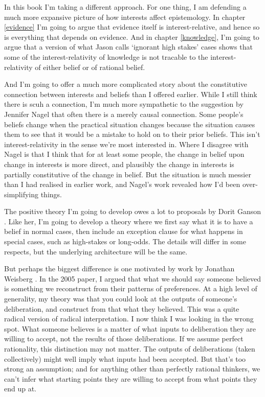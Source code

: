 \documentclass[11pt,]{book}
\begin{document}
In this book I'm taking a different approach. For one thing, I am defending a much more expansive picture of how interests affect epistemology. In chapter \ref{evidence} I'm going to argue that evidence itself is interest-relative, and hence so is everything that depends on evidence. And in chapter \ref{knowledge}, I'm going to argue that a version of what Jason \citet{Stanley2005} calls `ignorant high stakes' cases shows that some of the interest-relativity of knowledge is not tracable to the interest-relativity of either belief or of rational belief.

And I'm going to offer a much more complicated story about the constitutive connection between interests and beliefs than I offered earlier. While I still think there is scuh a connection, I'm much more sympathetic to the suggestion by Jennifer Nagel \citetext{\citeyear{Nagel2008}; \citeyear{Nagel2010}} that often there is a merely causal connection. Some people's beliefs change when the practical situation changes because the situation causes them to see that it would be a mistake to hold on to their prior beliefs. This isn't interest-relativity in the sense we're most interested in. Where I disagree with Nagel is that I think that for at least some people, the change in belief upon change in interests is more direct, and plausibly the change in interests is partially constitutive of the change in belief. But the situation is much messier than I had realised in earlier work, and Nagel's work revealed how I'd been over-simplifying things.

The positive theory I'm going to develop owes a lot to proposals by Dorit Ganson \citetext{\citeyear{Ganson2008}; \citeyear{Ganson2019}}. Like her, I'm going to develop a theory where we first say what it is to have a belief in normal cases, then include an exception clause for what happens in special cases, such as high-stakes or long-odds. The details will differ in some respects, but the underlying architecture will be the same.

But perhaps the biggest difference is one motivated by work by Jonathan Weisberg \citetext{\citeyear{Weisberg2013}; \citeyear{Weisberg2020}}. In the 2005 paper, I argued that what we should say someone believed is something we reconstruct from their patterns of preferences. At a high level of generality, my theory was that you could look at the outputs of someone's deliberation, and construct from that what they believed. This was a quite radical version of radical interpretation. I now think I was looking in the wrong spot. What someone believes is a matter of what inputs to deliberation they are willing to accept, not the results of those deliberations. If we assume perfect rationality, this distinction may not matter. The outputs of deliberations (taken collectively) might well imply what inputs had been accepted. But that's too strong an assumption; and for anything other than perfectly rational thinkers, we can't infer what starting points they are willing to accept from what points they end up at.
\end{document}
